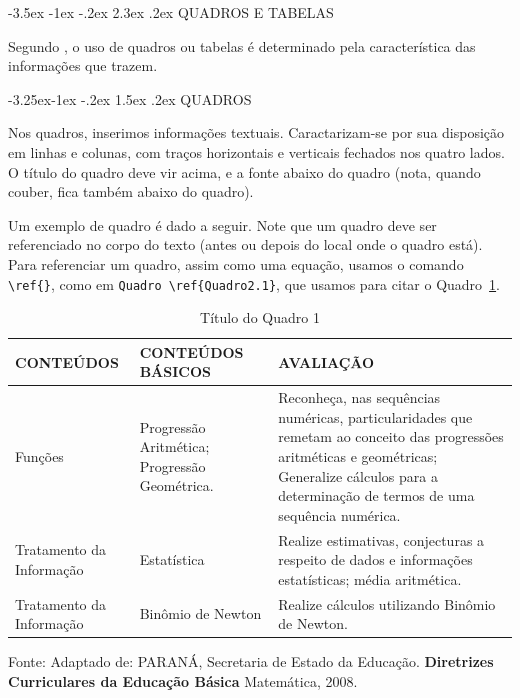 \documentclass[a4paper,12pt]{report}%
\makeatletter
\newcommand{\secfnt}{\fontsize{12}{12}}
\renewcommand\section{\@startsection {section}{1}{\z@}%
                  {-3.5ex \@plus -1ex \@minus -.2ex}%
                  {2.3ex \@plus.2ex}%
                  {\normalfont\secfnt}}
\renewcommand\subsection{\@startsection{subsection}{2}{\z@}%
                {-3.25ex\@plus -1ex \@minus -.2ex}%
                {1.5ex \@plus.2ex}%
                {\normalfont\secfnt}}
\makeatother
\begin{document}
\section{QUADROS E TABELAS}\label{Sec2.2}

\hspace{0.5cm}
Segundo \cite{UEPG}, o uso de quadros ou tabelas é determinado pela característica das informações que trazem. 

\subsection{QUADROS}\label{Subsec2.2.1}

\hspace{0.5cm} 
Nos quadros, inserimos informações textuais. Caractarizam-se por sua disposição em linhas e colunas, com traços horizontais e verticais fechados nos quatro lados. O título do quadro deve vir acima, e a fonte abaixo do quadro (nota, quando couber, fica também abaixo do quadro).

Um exemplo de quadro é dado a seguir. Note que um quadro deve ser referenciado no corpo do texto (antes ou depois do local onde o quadro está). Para referenciar um quadro, assim como uma equação, usamos o comando \verb|\ref{}|, como em \verb|Quadro \ref{Quadro2.1}|, que usamos para citar o Quadro~\ref{Quadro2.1}.

\begin{table}[!ht]
\begin{center}
\caption{\small Título do Quadro 1} \label{Quadro2.1}
\vspace{-0.2cm}
 \begin{tabular}{|p{3.8cm}|p{4.4cm}|p{6.0cm}|}
  \hline
  CONTEÚDOS & CONTEÚDOS \newline BÁSICOS & AVALIAÇÃO  \\ \hline
  Funções  & Progressão Aritmética; \newline Progressão Geométrica. 
  & Reconheça, nas sequências numéricas, particularidades que remetam ao conceito das progressões aritméticas e geométricas; 
  \newline Generalize cálculos para a determinação de termos de uma sequência numérica. \\ \hline 
  Tratamento da Informação & Estatística & Realize estimativas, conjecturas a respeito de dados e informações estatísticas; média aritmética. \\ \hline
  Tratamento da Informação & Binômio de Newton & Realize cálculos utilizando Binômio de Newton.
  \\ \hline
 \end{tabular}
\end{center}
{\small Fonte: Adaptado de: PARANÁ, Secretaria de Estado da Educação. {\bf Diretrizes Curriculares da Educação Básica} Matemática, 2008.}
\end{table}
\end{document}
